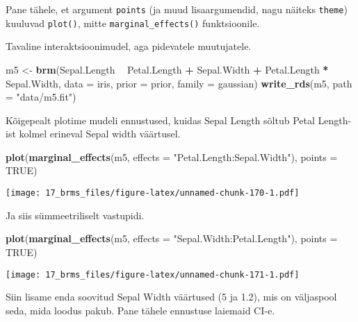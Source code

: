 \documentclass[]{article}
\newenvironment{Shaded}{\begin{snugshade}}{\end{snugshade}}
\newcommand{\KeywordTok}[1]{\textcolor[rgb]{0.13,0.29,0.53}{\textbf{#1}}}
\newcommand{\DataTypeTok}[1]{\textcolor[rgb]{0.13,0.29,0.53}{#1}}
\newcommand{\StringTok}[1]{\textcolor[rgb]{0.31,0.60,0.02}{#1}}
\newcommand{\OtherTok}[1]{\textcolor[rgb]{0.56,0.35,0.01}{#1}}
\newcommand{\OperatorTok}[1]{\textcolor[rgb]{0.81,0.36,0.00}{\textbf{#1}}}
\newcommand{\NormalTok}[1]{#1}
\begin{document}
Pane tähele, et argument \texttt{points} (ja muud lisaargumendid, nagu
näiteks \texttt{theme}) kuuluvad \texttt{plot()}, mitte
\texttt{marginal\_effects()} funktsioonile.

Tavaline interaktsioonimudel, aga pidevatele muutujatele.

\begin{Shaded}
\begin{Highlighting}[]
\NormalTok{m5 <-}\StringTok{ }\KeywordTok{brm}\NormalTok{(Sepal.Length }\OperatorTok{~}\StringTok{ }\NormalTok{Petal.Length }\OperatorTok{+}\StringTok{ }\NormalTok{Sepal.Width }\OperatorTok{+}\StringTok{ }\NormalTok{Petal.Length }\OperatorTok{*}\StringTok{ }\NormalTok{Sepal.Width, }
          \DataTypeTok{data =}\NormalTok{ iris, }
          \DataTypeTok{prior =}\NormalTok{ prior, }
          \DataTypeTok{family =}\NormalTok{ gaussian)}
\KeywordTok{write_rds}\NormalTok{(m5, }\DataTypeTok{path =} \StringTok{"data/m5.fit"}\NormalTok{)}
\end{Highlighting}
\end{Shaded}

Kõigepealt plotime mudeli ennustused, kuidas Sepal Length sõltub Petal
Length-ist kolmel erineval Sepal width väärtusel.

\begin{Shaded}
\begin{Highlighting}[]
\KeywordTok{plot}\NormalTok{(}\KeywordTok{marginal_effects}\NormalTok{(m5, }\DataTypeTok{effects =} \StringTok{"Petal.Length:Sepal.Width"}\NormalTok{), }\DataTypeTok{points =} \OtherTok{TRUE}\NormalTok{)}
\end{Highlighting}
\end{Shaded}

\texttt{[image: 17\_brms\_files/figure-latex/unnamed-chunk-170-1.pdf]}

Ja siis sümmeetriliselt vastupidi.

\begin{Shaded}
\begin{Highlighting}[]
\KeywordTok{plot}\NormalTok{(}\KeywordTok{marginal_effects}\NormalTok{(m5, }\DataTypeTok{effects =} \StringTok{"Sepal.Width:Petal.Length"}\NormalTok{), }\DataTypeTok{points =} \OtherTok{TRUE}\NormalTok{)}
\end{Highlighting}
\end{Shaded}

\texttt{[image: 17\_brms\_files/figure-latex/unnamed-chunk-171-1.pdf]}

Siin lisame enda soovitud Sepal Width väärtused (5 ja 1.2), mis on
väljaspool seda, mida loodus pakub. Pane tähele ennustuse laiemaid CI-e.
\end{document}
